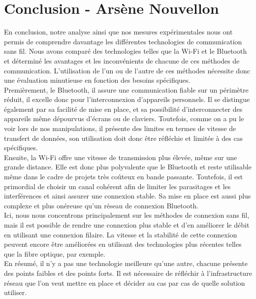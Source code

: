 \documentclass[12]{article}
\begin{document}
\newpage
\section*{Conclusion - Arsène Nouvellon}

En conclusion, notre analyse ainsi que nos mesures expérimentales nous ont permis de comprendre davantage les différentes technologies de communication sans fil. Nous avons comparé des technologies telles que la Wi-Fi et le Bluetooth et déterminé les avantages et les inconvénients de chacune de ces méthodes de communication. L'utilisation de l'un ou de l'autre de ces méthodes nécessite donc une évaluation minutieuse en fonction des besoins spécifiques.\\

Premièrement, le Bluetooth, il assure une communication fiable sur un périmètre réduit, il excelle donc pour l'interconnexion d'appareils personnels. Il se distingue également par sa facilité de mise en place, et sa possibilité d'interconnecter des appareils même dépourvus d'écrans ou de claviers. Toutefois, comme on a pu le voir lors de nos manipulations, il présente des limites en termes de vitesse de transfert de données, son utilisation doit donc être réfléchie et limitée à des cas spécifiques.\\

Ensuite, la Wi-Fi offre une vitesse de transmission plus élevée, même sur une grande distance. Elle est donc plus polyvalente que le Bluetooth et reste utilisable même dans le cadre de projets très coûteux en bande passante. Toutefois, il est primordial de choisir un canal cohérent afin de limiter les parasitages et les interférences et ainsi assurer une connexion stable. Sa mise en place est aussi plus complexe et plus onéreuse qu'un réseau de connexion Bluetooth.\\

Ici, nous nous concentrons principalement sur les méthodes de connexion sans fil, mais il est possible de rendre une connexion plus stable et d'en améliorer le débit en utilisant une connexion filaire. La vitesse et la stabilité de cette connexion peuvent encore être améliorées en utilisant des technologies plus récentes telles que la fibre optique, par exemple. \\

En résumé, il n'y a pas une technologie meilleure qu'une autre, chacune présente des points faibles et des points forts. Il est nécessaire de réfléchir à l'infrastructure réseau que l'on veut mettre en place et décider au cas par cas de quelle solution utiliser.\\
\end{document}
